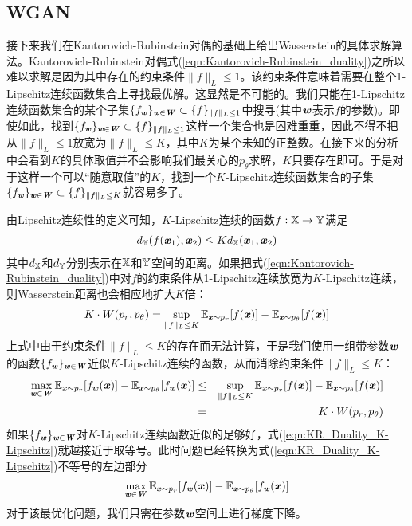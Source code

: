 \subsection{WGAN}
接下来我们在Kantorovich-Rubinstein对偶的基础上给出Wasserstein的具体求解算法。Kantorovich-Rubinstein对偶式(\ref{eqn:Kantorovich-Rubinstein_duality})之所以难以求解是因为其中存在的约束条件$\|f\|_{L}\leq1$。该约束条件意味着需要在整个1-Lipschitz连续函数集合上寻找最优解。这显然是不可能的。我们只能在1-Lipschitz连续函数集合的某个子集$\{f_{\Vw}\}_{\Vw\in\MW}\subset\{f\}_{\|f\|_{L}\leq1}$中搜寻(其中$\Vw$表示$f$的参数)。即使如此，找到$\{f_{\Vw}\}_{\Vw\in\MW}\subset\{f\}_{\|f\|_{L}\leq1}$这样一个集合也是困难重重，因此不得不把从$\|f\|_{L}\leq1$放宽为$\|f\|_{L}\leq K$，其中$K$为某个未知的正整数。在接下来的分析中会看到$K$的具体取值并不会影响我们最关心的$p_{\theta}$求解，$K$只要存在即可。于是对于这样一个可以“随意取值”的$K$，找到一个$K$-Lipschitz连续函数集合的子集$\{f_{\Vw}\}_{\Vw\in\MW}\subset\{f\}_{\|f\|_{L}\leq K}$就容易多了。

由Lipschitz连续性的定义可知，$K$-Lipschitz连续的函数$f:\SetX\to\SetY$满足
\begin{eqnarray}
d_{\SetY}(f(\Vx_{1}),\Vx_{2}) \leq Kd_{\SetX}(\Vx_{1},\Vx_{2})
\end{eqnarray}
其中$d_{\SetX}$和$d_{\SetY}$分别表示在$\SetX$和$\SetY$空间的距离。如果把式(\ref{eqn:Kantorovich-Rubinstein_duality})中对$f$的约束条件从1-Lipschitz连续放宽为$K$-Lipschitz连续，则Wasserstein距离也会相应地扩大$K$倍：
\begin{eqnarray}
K\cdot W(p_{r},p_{\theta}) = \sup_{\|f\|_{L}\leq K} \SetE_{\Vx\sim p_{r}}[f(\Vx)] - \SetE_{\Vx\sim p_{\theta}}[f(\Vx)]
\end{eqnarray}
上式中由于约束条件$\|f\|_{L}\leq K$的存在而无法计算，于是我们使用一组带参数$\Vw$的函数$\{f_{\Vw}\}_{\Vw\in\MW}$近似$K$-Lipschitz连续的函数，从而消除约束条件$\|f\|_{L}\leq K$：
\begin{eqnarray}
\max_{\Vw\in\MW}\SetE_{\Vx\sim p_{r}}[f_{\Vw}(\Vx)] - \SetE_{\Vx\sim p_{\theta}}[f_{\Vw}(\Vx)] 
&\leq& \sup_{\|f\|_{L}\leq K} \SetE_{\Vx\sim p_{r}}[f(\Vx)] - \SetE_{\Vx\sim p_{\theta}}[f(\Vx)] \label{eqn:KR_Duality_K-Lipschitz}\\
&=& K\cdot W(p_{r},p_{\theta})\label{eqn:K_times_gradient}
\end{eqnarray}
如果$\{f_{\Vw}\}_{\Vw\in\MW}$对$K$-Lipschitz连续函数近似的足够好，式(\ref{eqn:KR_Duality_K-Lipschitz})就越接近于取等号。此时问题已经转换为式(\ref{eqn:KR_Duality_K-Lipschitz})不等号的左边部分
\begin{eqnarray}
\max_{\Vw\in\MW}\SetE_{\Vx\sim p_{r}}[f_{\Vw}(\Vx)] - \SetE_{\Vx\sim p_{\theta}}[f_{\Vw}(\Vx)]\label{eqn:WGAN_problem}
\end{eqnarray}
对于该最优化问题，我们只需在参数$\Vw$空间上进行梯度下降。

